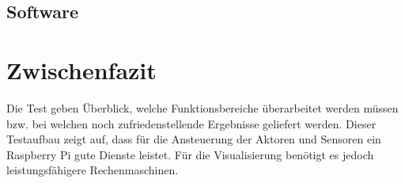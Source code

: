\subsection {Software}
\label{subsec:testSoftware}

\section{Zwischenfazit}
\label{sec:Fazit}

Die Test geben Überblick, welche Funktionsbereiche überarbeitet werden müssen bzw. bei welchen noch zufriedenstellende Ergebnisse geliefert werden.
Dieser Testaufbau zeigt auf, dass für die Ansteuerung der Aktoren und Sensoren ein Raspberry Pi gute Dienste leistet. Für die Visualisierung benötigt es jedoch leistungsfähigere Rechenmaschinen.  